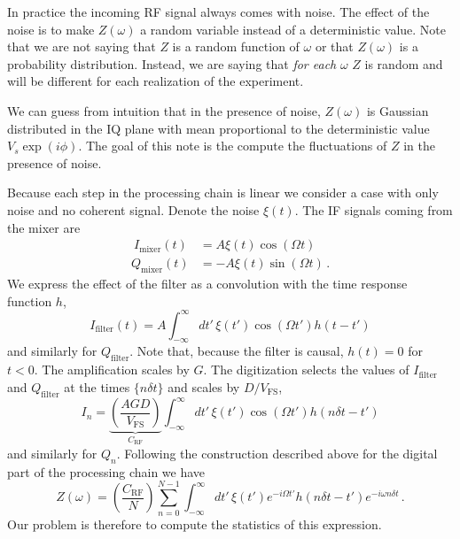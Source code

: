 
In practice the incoming RF signal always comes with noise.
The effect of the noise is to make $Z(\omega)$ a random variable instead of a deterministic value.
Note that we are not saying that $Z$ is a random function of $\omega$ or that $Z(\omega)$ is a probability distribution.
Instead, we are saying that \emph{for each }$\omega$ $Z$ is random and will be different for each realization of the experiment.

We can guess from intuition that in the presence of noise, $Z(\omega)$ is Gaussian distributed in the IQ plane with mean proportional to the deterministic value $V_s \exp(i \phi)$.
The goal of this note is the compute the fluctuations of $Z$ in the presence of noise.

Because each step in the processing chain is linear we consider a case with only noise and no coherent signal.
Denote the noise $\xi(t)$.
The IF signals coming from the mixer are
\begin{align}\
  I_\text{mixer}(t) &= A \xi(t) \cos(\Omega t) \\
  Q_\text{mixer}(t) &= - A \xi(t) \sin(\Omega t) \, .
\end{align}
We express the effect of the filter as a convolution with the time response function $h$,
\begin{equation}
  I_\text{filter}(t) = A \int_{-\infty}^\infty dt' \, \xi(t') \cos(\Omega t') h(t - t')
\end{equation}
and similarly for $Q_\text{filter}$.
Note that, because the filter is causal, $h(t)=0$ for $t<0$.
The amplification scales by $G$.
The digitization selects the values of $I_\text{filter}$ and $Q_\text{filter}$ at the times $\{ n \delta t \}$ and scales by $D/V_\text{FS}$,
\begin{equation}
  I_n = \underbrace{ \left(\frac{A G D}{V_\text{FS}} \right)}_{C_\text{RF}}
  \int_{-\infty}^\infty dt' \, \xi(t') \cos(\Omega t') h(n \delta t - t')
\end{equation}
and similarly for $Q_n$.
Following the construction described above for the digital part of the processing chain we have
\begin{equation}
Z(\omega) =
  \left( \frac{C_\text{RF}}{N} \right) \sum_{n=0}^{N-1}
  \int_{-\infty}^\infty dt' \, \xi(t') e^{-i \Omega t'} h(n \delta t - t') e^{-i \omega n \delta t} \, .
\end{equation}
Our problem is therefore to compute the statistics of this expression.

